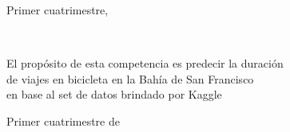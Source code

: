 \documentclass{tcc}
\begin{document}
\vfill
\begin{center}
Primer cuatrimestre, \the\year
\end{center}
\newpage
\begin{center}
\theauthor
\end{center}
\vspace{3in}
\begin{center}
\LARGE{\thetitle}\\
\end{center}

\vspace{2in}

\begin{flushright}
El propósito de esta competencia es predecir
la duración \\de viajes en bicicleta en la
Bahía de San Francisco \\en base al set de datos brindado por Kaggle
\\
\vspace{0.2in}



\end{flushright}

\vfill
\begin{center}
Primer cuatrimestre de \the\year
\end{center}


\newpage




\newpage

\renewcommand*\contentsname{Contenido}
\pagestyle{plain} %
\tableofcontents

\newpage





\renewcommand{\refname}{\centering REFERENCIAS} %

\nocite{*}





\end{document}
